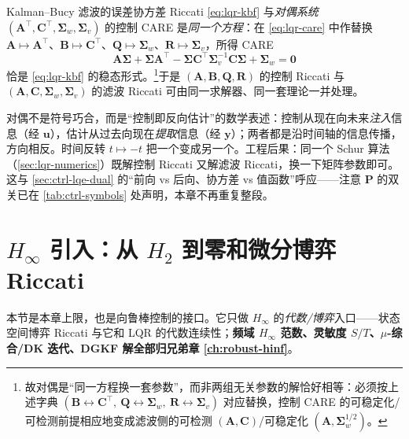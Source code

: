 \begin{proposition}[严格对偶]\label{prop:lqr-duality}
Kalman--Bucy 滤波的误差协方差 Riccati \cref{eq:lqr-kbf} 与\emph{对偶系统} $(\mathbf A^\top,\mathbf C^\top,\boldsymbol\Sigma_w,\boldsymbol\Sigma_v)$ 的控制 CARE 是\emph{同一个方程}：在 \cref{eq:lqr-care} 中作替换 $\mathbf A\mapsto\mathbf A^\top$、$\mathbf B\mapsto\mathbf C^\top$、$\mathbf Q\mapsto\boldsymbol\Sigma_w$、$\mathbf R\mapsto\boldsymbol\Sigma_v$，所得 CARE
\[
  \mathbf A\boldsymbol\Sigma+\boldsymbol\Sigma\mathbf A^\top-\boldsymbol\Sigma\mathbf C^\top\boldsymbol\Sigma_v^{-1}\mathbf C\boldsymbol\Sigma+\boldsymbol\Sigma_w=\mathbf0
\]
恰是 \cref{eq:lqr-kbf} 的稳态形式。\footnote{故对偶是“同一方程换一套参数”，而非两组无关参数的解恰好相等：必须按上述字典 $(\mathbf B\!\leftrightarrow\!\mathbf C^\top,\ \mathbf Q\!\leftrightarrow\!\boldsymbol\Sigma_w,\ \mathbf R\!\leftrightarrow\!\boldsymbol\Sigma_v)$ 对应替换，控制 CARE 的可稳定化/可检测前提相应地变成滤波侧的可检测 $(\mathbf A,\mathbf C)$/可稳定化 $(\mathbf A,\boldsymbol\Sigma_w^{1/2})$。}于是 $(\mathbf A,\mathbf B,\mathbf Q,\mathbf R)$ 的控制 Riccati 与 $(\mathbf A,\mathbf C,\boldsymbol\Sigma_w,\boldsymbol\Sigma_v)$ 的滤波 Riccati 可由同一求解器、同一套理论一并处理。
\end{proposition}

\begin{insight}
对偶不是符号巧合，而是“控制即反向估计”的数学表述：控制从现在向未来\emph{注入}信息（经 $\mathbf u$），估计从过去向现在\emph{提取}信息（经 $\mathbf y$）；两者都是沿时间轴的信息传播，方向相反。时间反转 $t\mapsto-t$ 把一个变成另一个。工程后果：同一个 Schur 算法（\cref{sec:lqr-numerics}）既解控制 Riccati 又解滤波 Riccati，换一下矩阵参数即可。这与 \cref{sec:ctrl-lqe-dual} 的“前向 vs 后向、协方差 vs 值函数”呼应——注意 $\mathbf P$ 的双关已在 \cref{tab:ctrl-symbols} 处声明，本章不再重复整段。
\end{insight}

\section{\texorpdfstring{$H_\infty$}{H-infinity} 引入：从 \texorpdfstring{$H_2$}{H2} 到零和微分博弈 Riccati}
\label{sec:lqr-hinf}

本节是本章上限，也是向鲁棒控制的接口。它只做 $H_\infty$ 的\emph{代数/博弈}入口——状态空间博弈 Riccati 与它和 LQR 的代数连续性；\textbf{频域 $H_\infty$ 范数、灵敏度 $S/T$、$\mu$-综合/DK 迭代、DGKF 解全部归兄弟章 \cref{ch:robust-hinf}}。

